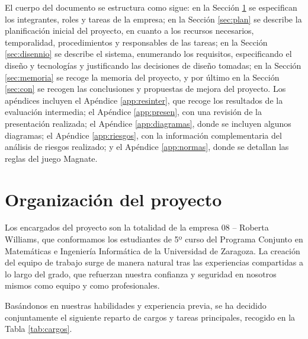 \documentclass[11pt]{article}
\begin{document}
El cuerpo del documento se estructura como sigue: en la Sección \ref{sec:equipo}
se especifican los integrantes, roles y tareas de la empresa; en la Sección
\ref{sec:plan} se describe la planificación inicial del proyecto, en cuanto a
los recursos necesarios, temporalidad, procedimientos
y responsables de las tareas; en la Sección \ref{sec:disennio} se describe el sistema,
enumerando los requisitos, especificando el diseño y tecnologías y justificando
las decisiones de diseño tomadas; en la Sección \ref{sec:memoria} se recoge
la memoria del proyecto, y por último en la Sección \ref{sec:con} se recogen las
conclusiones y propuestas de mejora del proyecto.
Los apéndices incluyen 
el Apéndice \ref{app:resinter}, que recoge los resultados de la evaluación intermedia;
el Apéndice \ref{app:presen}, con una revisión de la presentación realizada;
el Apéndice \ref{app:diagramas}, donde se incluyen algunos diagramas;
el Apéndice \ref{app:riesgos}, con la información complementaria del análisis de
riesgos realizado;
y el Apéndice \ref{app:normas}, donde se detallan las reglas del juego Magnate.

\newpage

\section{Organización del proyecto}
\label{sec:equipo}
Los encargados del proyecto son la totalidad de la empresa 08 -- Roberta Williams, que conformamos los estudiantes de
5º curso del Programa Conjunto en Matemáticas e Ingeniería Informática de la Universidad de Zaragoza. 
La creación del equipo de trabajo surge de manera natural tras las experiencias compartidas a lo
largo del grado, que refuerzan nuestra confianza y seguridad en nosotros mismos como equipo y como
profesionales. 

Basándonos en nuestras habilidades y experiencia previa, se ha decidido conjuntamente el siguiente 
reparto de cargos y tareas principales, 
recogido en la Tabla \ref{tab:cargos}.
\end{document}
